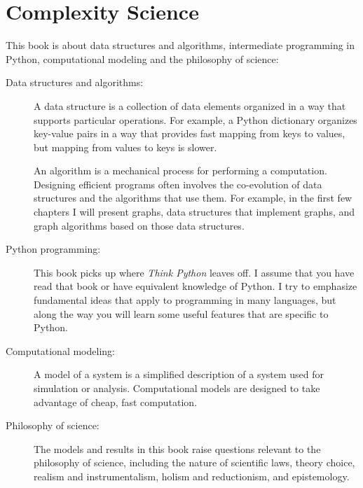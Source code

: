 \documentclass[10pt]{book}
\begin{document}
\normalsize

\clearemptydoublepage

\begin{latexonly}

\tableofcontents

\clearemptydoublepage

\end{latexonly}

\mainmatter

\chapter{Complexity Science}

This book is about data structures and algorithms, intermediate
programming in Python, computational modeling and
the philosophy of science:

\begin{description}

\item[Data structures and algorithms:] A data structure is a
  collection of data elements organized in a way that supports
  particular operations.  For example, a Python dictionary organizes
  key-value pairs in a way that provides fast mapping from keys to
  values, but mapping from values to keys is slower.

An algorithm is a mechanical process for performing a computation.
Designing efficient programs often involves the co-evolution of data
structures and the algorithms that use them.  For example, in the
first few chapters I will present graphs, data structures that
implement graphs, and graph algorithms based on those data structures.

\item[Python programming:] This book picks up where {\em Think Python}
  leaves off.  I assume that you have read that book or have
  equivalent knowledge of Python.  I try to emphasize fundamental ideas
  that apply to programming in many languages, but along the way you
  will learn some useful features that are specific to Python.

\item[Computational modeling:] A model of a system is a simplified
  description of a system used for simulation or analysis.
  Computational models are designed to take advantage of cheap, fast
  computation.

\item[Philosophy of science:] The models and results in this book
  raise questions relevant to the philosophy of science,
  including the nature of scientific laws, theory choice, realism and
  instrumentalism, holism and reductionism, and epistemology.

\end{description}
\end{document}
